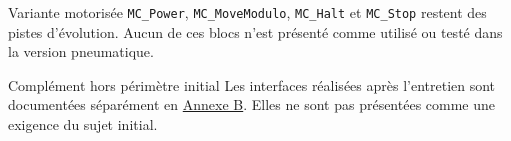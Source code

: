 {  \begin{notebox}[colback=ekinfo,colframe=blue!25]{Variante motorisée}
    \texttt{MC\_Power}, \texttt{MC\_MoveModulo}, \texttt{MC\_Halt} et \texttt{MC\_Stop} restent des pistes d'évolution. Aucun de ces blocs n'est présenté comme utilisé ou testé dans la version pneumatique.
  \end{notebox}

  \begin{notebox}{Complément hors périmètre initial}
    Les interfaces réalisées après l'entretien sont documentées séparément en \hyperref[annexe:ihm]{Annexe B}. Elles ne sont pas présentées comme une exigence du sujet initial.
  \end{notebox}
}

\newpage


